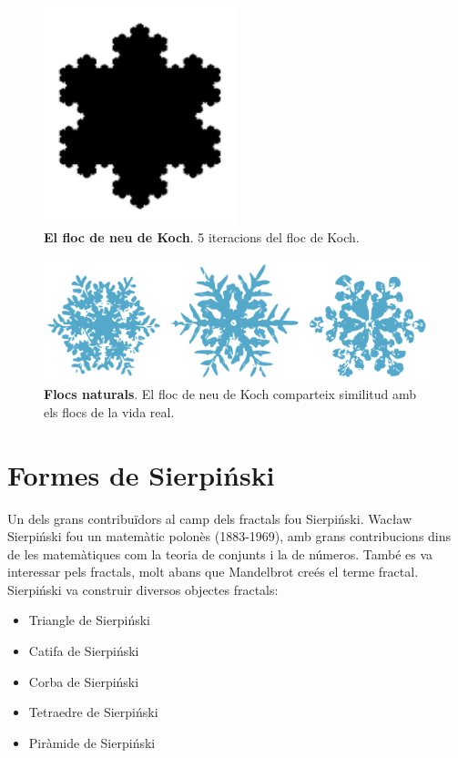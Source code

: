 \documentclass[12pt,a4paper]{report}
\begin{document}
\begin{figure}[!ht]
\centering
\includegraphics[width=0.5\textwidth]{img/img03_06_koch_04.pdf}
\caption{\textbf{El floc de neu de Koch}. 5 iteracions del floc de Koch.}
\label{img03_07}
\end{figure}

\begin{figure}[!ht]
\centering
\includegraphics[scale=.5]{img/img03_08.pdf}
\caption{\textbf{Flocs naturals}. El floc de neu de Koch comparteix similitud amb els flocs de la vida real.}
\end{figure}

\section{Formes de Sierpiński}
Un dels grans contribuïdors al camp dels fractals fou Sierpiński. Wacław Sierpiński fou un matemàtic polonès (1883-1969), amb grans contribucions dins de les matemàtiques com la teoria de conjunts i la de números. També es va interessar pels fractals, molt abans que Mandelbrot creés el terme fractal. Sierpiński va construir diversos objectes fractals:
\begin{itemize}
\item Triangle de Sierpiński
\item Catifa de Sierpiński
\item Corba de Sierpiński
\item Tetraedre de Sierpiński
\item Piràmide de Sierpiński
\end{itemize}
\end{document}

